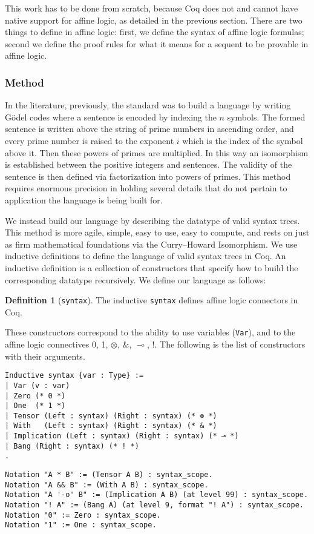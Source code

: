 \documentclass{article}
\theoremstyle{definition}
\newtheorem{defn}{Definition}
\begin{document}
This work has to be done from scratch, because Coq does not and cannot have native support for affine logic, as detailed in the previous section. There are two things to define in affine logic: first, we define the syntax of affine logic formulas; second we define the proof rules for what it means for a sequent to be provable in affine logic. 

\subsubsection{Method}\label{library:affine:method}

In the literature, previously, the standard was to build a language by writing Gödel codes where a sentence is encoded by indexing the $n$ symbols. The formed sentence is written above the string of prime numbers in ascending order, and every prime number is raised to the exponent $i$ which is the index of the symbol above it. Then these powers of primes are multiplied. In this way an isomorphism is established between the positive integers and sentences. The validity of the sentence is then defined via factorization into powers of primes. This method requires enormous precision in holding several details that do not pertain to application the language is being built for. 

We instead build our language by describing the datatype of valid syntax trees. This method is more agile, simple, easy to use, easy to compute, and rests on just as firm mathematical foundations via the Curry--Howard Isomorphism. We use inductive definitions to define the language of valid syntax trees in Coq. An inductive definition is a collection of constructors that specify how to build the corresponding datatype recursively. We define our language as follows: 

\begin{defn}[\texttt{syntax}]
The inductive \verb|syntax| defines affine logic connectors in Coq. 
\end{defn}


These constructors correspond to the ability to use variables (\verb|Var|), and to the affine logic connectives 0, 1, $\otimes$, $\&$, $\multimap$, $!$.  The following is the list of constructors with their arguments.

\begin{verbatim}
Inductive syntax {var : Type} :=
| Var (v : var)
| Zero (* 0 *)
| One  (* 1 *)
| Tensor (Left : syntax) (Right : syntax) (* ⊗ *)
| With   (Left : syntax) (Right : syntax) (* & *)
| Implication (Left : syntax) (Right : syntax) (* ⊸ *)
| Bang (Right : syntax) (* ! *)
.
\end{verbatim}
\begin{verbatim}
Notation "A * B" := (Tensor A B) : syntax_scope.
Notation "A && B" := (With A B) : syntax_scope.
Notation "A '-o' B" := (Implication A B) (at level 99) : syntax_scope.
Notation "! A" := (Bang A) (at level 9, format "! A") : syntax_scope.
Notation "0" := Zero : syntax_scope.
Notation "1" := One : syntax_scope.
\end{verbatim}
\end{document}
